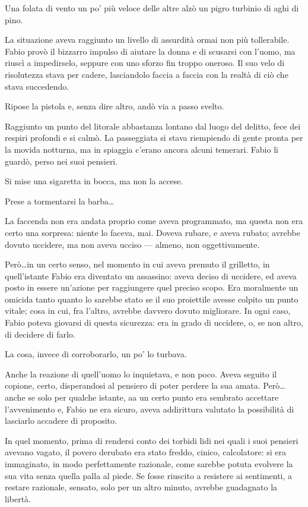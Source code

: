 Una folata di vento un po' più veloce delle altre alzò un pigro turbinio di aghi di pino.

La situazione aveva raggiunto un livello di assurdità ormai non più tollerabile. Fabio provò il bizzarro impulso di aiutare la donna e di scusarsi con l'uomo, ma riuscì a impedirselo, seppure con uno sforzo fin troppo oneroso. Il suo velo di risolutezza stava per cadere, lasciandolo faccia a faccia con la realtà di ciò che stava succedendo. 

Ripose la pistola e, senza dire altro, andò via a passo svelto.

Raggiunto un punto del litorale abbastanza lontano dal luogo del delitto, fece dei respiri profondi e si calmò. La passeggiata si stava riempiendo di gente pronta per la movida notturna, ma in spiaggia c'erano ancora alcuni temerari. Fabio li guardò, perso nei suoi pensieri. 

Si mise una sigaretta in bocca, ma non la accese. 

Prese a tormentarsi la barba\ldots

La faccenda non era andata proprio come aveva programmato, ma questa non era certo una sorpresa: niente lo faceva, mai. Doveva rubare, e aveva rubato; avrebbe dovuto uccidere, ma non aveva ucciso --- almeno, non oggettivamente. 

Però\ldots \thinspace in un certo senso, nel momento in cui aveva premuto il grilletto, in quell'istante Fabio era diventato un assassino: aveva deciso di uccidere, ed aveva posto in essere un'azione per raggiungere quel preciso scopo. Era moralmente un omicida tanto quanto lo sarebbe stato se il suo proiettile avesse colpito un punto vitale; cosa in cui, fra l'altro, avrebbe davvero dovuto migliorare. In ogni caso, Fabio poteva giovarsi di questa sicurezza: era in grado di uccidere, o, se non altro, di decidere di farlo. 

La cosa, invece di corroborarlo, un po' lo turbava.

Anche la reazione di quell'uomo lo inquietava, e non poco. Aveva seguito il copione, certo, disperandosi al pensiero di poter perdere la sua amata. Però\ldots \thinspace anche se solo per qualche istante, aa un certo punto era sembrato accettare l'avvenimento e, Fabio ne era sicuro, aveva addirittura valutato la possibilità di lasciarlo accadere di proposito. 

In quel momento, prima di rendersi conto dei torbidi lidi nei quali i suoi pensieri avevano vagato, il povero derubato era stato freddo, cinico, calcolatore: si era immaginato, in modo perfettamente razionale, come sarebbe potuta evolvere la sua vita senza quella palla al piede. Se fosse riuscito a resistere ai sentimenti, a restare razionale, sensato, solo per un altro minuto, avrebbe guadagnato la libertà. 


